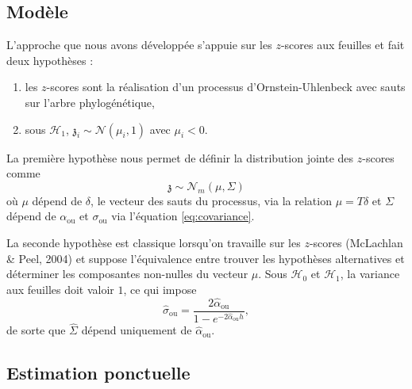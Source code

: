 \documentclass[12pt,a4paper]{reedthesis}
\providecommand{\tightlist}{%
  \setlength{\itemsep}{0pt}\setlength{\parskip}{0pt}}
\newcommand \normal [2] {\mathcal{N}\left({#1},{#2}\right)}
\newcommand \ou [1]{{#1}_{\text{ou}}}
\newcommand \zs {\mathfrak{z}}
\newcommand \shifts {\delta}
\theoremstyle{definition}
\theoremstyle{definition}
\theoremstyle{definition}
\theoremstyle{remark}
\begin{document}
\hypertarget{moduxe8le}{%
\subsection{Modèle}\label{moduxe8le}}

L'approche que nous avons développée s'appuie sur les \(z\)-scores aux feuilles et fait deux hypothèses :
\begin{enumerate}
\def\labelenumi{\arabic{enumi}.}
\tightlist
\item
  les \(z\)-scores sont la réalisation d'un processus d'Ornstein-Uhlenbeck avec sauts sur l'arbre phylogénétique,
\item
  sous \(\mathcal{H}_1\), \(\zs_i \sim \normal{\mu_i}{1}\) avec \(\mu_i < 0\).
\end{enumerate}
La première hypothèse nous permet de définir la distribution jointe des \(z\)-scores comme
\begin{equation*}
\zs \sim \mathcal{N}_{m}\left(\mu,\Sigma\right)
\end{equation*}
où \(\mu\) dépend de \(\shifts\), le vecteur des sauts du processus, via la relation \(\mu = T\delta\) et \(\Sigma\) dépend de \(\ou{\alpha}\) et \(\ou{\sigma}\) via l'équation \eqref{eq:covariance}.

La seconde hypothèse est classique lorsqu'on travaille sur les \(z\)-scores (McLachlan \& Peel, 2004) et suppose l'équivalence entre trouver les hypothèses alternatives et déterminer les composantes non-nulles du vecteur \(\mu\). Sous \(\mathcal{H}_0\) et \(\mathcal{H}_1\), la variance aux feuilles doit valoir \(1\), ce qui impose
\begin{equation*}
\ou{\hat{\sigma}}=\frac{2\ou{\hat{\alpha}}}{1 - e^{-2\ou{\hat{\alpha}}h}},
\end{equation*}
de sorte que \(\widehat{\Sigma}\) dépend uniquement de \(\ou{\hat{\alpha}}\).

\hypertarget{estimation-ponctuelle}{%
\subsection{Estimation ponctuelle}\label{estimation-ponctuelle}}
\end{document}
